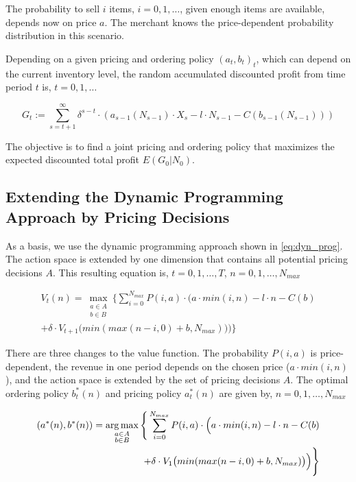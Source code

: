 The probability to sell $i$ items, $i=0,1,\ldots$, given enough items are available, depends now on price $a$.
The merchant knows the price-dependent probability distribution in this scenario.

Depending on a given pricing and ordering policy $(a_t, b_t)_t$, which can depend on the current inventory level, the random accumulated discounted profit from time period $t$ is, $t=0,1,\ldots$

$$
G_t := \sum_{s=t+1}^{\infty} \delta^{s-t} \cdot (a_{s-1}(N_{s-1}) \cdot X_s - l \cdot N_{s-1} - C(b_{s-1}(N_{s-1})))
$$

The objective is to find a joint pricing and ordering policy that maximizes the expected discounted total profit $E(G_0 | N_0)$.

\subsection{Extending the Dynamic Programming Approach by Pricing Decisions}
\label{section:joint_solution}
As a basis, we use the dynamic programming approach shown in \cref{eq:dyn_prog}.
The action space is extended by one dimension that contains all potential pricing decisions $A$.
This resulting equation is, $t=0, 1, \ldots,T$, $n = 0,1,\ldots,N_{max}$

\begin{equation}
\begin{split}
V_t(n) = \max_{\substack{a \in A \\ b \in B}} \Bigg\{
\sum_{i = 0}^{N_{max}}
P(i, a) \cdot \Big(
a \cdot min(i, n) %
- l \cdot n %
- C(b) %
 \\
+ \delta \cdot V_{t+1}\big(min(max(n - i, 0) + b, N_{max})\big)
\Big)\Bigg\}
\end{split}
\label{eq:dyn_prog_joint}
\end{equation}

There are three changes to the value function.
The probability $P(i, a)$ is price-dependent, the revenue in one period depends on the chosen price ($a \cdot min(i, n)$), and the action space is extended by the set of pricing decisions $A$.
The optimal ordering policy $b^*_t(n)$ and pricing policy $a^*_t(n)$ are given by, $n=0,1,\ldots,N_{max}$

\begin{equation}
\begin{split}
(a^*(n), b^*(n)) = \argmax_{\substack{a \in A \\ b \in B}} \Bigg\{
\sum_{i = 0}^{N_{max}}
P(i, a) \cdot \Big(
a \cdot min(i, n) %
- l \cdot n %
- C(b) %
 \\
+ \delta \cdot V_{1}\big(min(max(n - i, 0) + b, N_{max})\big)
\Big)\Bigg\}
\end{split}
\label{eq:joint_best_price_order}
\end{equation}

